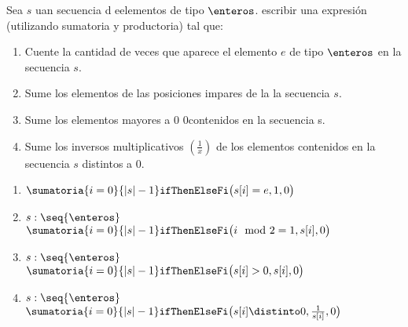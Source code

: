 \begin{enunciado}{\ejercicio}
  Sea $s$ uan secuencia d eelementos de tipo $\enteros$. escribir una expresión
  (utilizando sumatoria y productoria) tal que:
  \begin{enumerate}[label=\alph*)]
    \item Cuente la cantidad de veces que aparece el elemento $e$ de tipo $\enteros$ en la secuencia $s$.
    \item Sume los elementos de las posiciones impares de la la secuencia $s$.
    \item Sume los elementos mayores a 0 0contenidos en la secuencia s.
    \item Sume los inversos multiplicativos $(\frac{1}{x})$ de los elementos contenidos en la secuencia $s$ distintos a 0.
  \end{enumerate}
\end{enunciado}

\begin{enumerate}[label=\alph*)]
  \item {}
        {$\sumatoria{i = 0}{|s| - 1} \texttt{ifThenElseFi}\bigl( s[i] = e,1,0 \bigr)$}

\item {}
        {$s:\seq{\enteros}$}
                {$\sumatoria{i = 0}{|s| - 1} \texttt{ifThenElseFi}\bigl( i \mod 2 = 1, s[i], 0 \bigr)$}

\item {}
        {$s:\seq{\enteros}$}
                {$\sumatoria{i = 0}{|s| - 1} \texttt{ifThenElseFi}\bigl( s[i] > 0, s[i], 0 \bigr)$}

\item {}
        {$s:\seq{\enteros}$}
                {$\sumatoria{i = 0}{|s| - 1} \texttt{ifThenElseFi}\bigl( s[i] \distinto 0, \frac{1}{s[i]}, 0 \bigr)$}
\end{enumerate}
